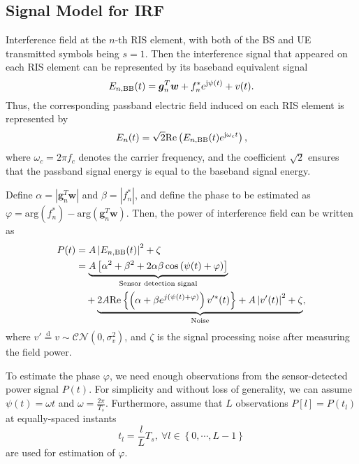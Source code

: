 \documentclass[12pt,draftclsnofoot,journal,onecolumn]{IEEEtran}
\theoremstyle{nonumberplain}
\def \arg {\text{arg}}
\begin{document}
\subsection{Signal Model for IRF}
\label{Models for IRFs}
    Interference field at the $n$-th RIS element, with both of the  \ac{BS} and \ac{UE} transmitted symbols being $s=1$. Then the interference signal that appeared on each RIS element can be represented by its baseband equivalent signal
    \begin{equation}
    \label{interference}
    E_{n,{\rm BB}}(t)=\bm g_{n}^{T}\bm w+f_{n}^{*}e^{{\rm j}\psi (t)}+v(t).
    \end{equation}
    Thus, the corresponding passband electric field induced on each RIS element is represented by 
    \begin{equation}
        E_{n}(t) = \sqrt{2} {\rm Re}\left( E_{n,{\rm BB}}(t)e^{{\rm j}\omega_c t} \right),
    \end{equation}
    where $\omega_c = 2\pi f_c$ denotes the carrier frequency, and the coefficient $\sqrt{2}$ ensures that the passband signal energy is equal to the baseband signal energy. 

    Define $\alpha = \left\vert\bm g_{n}^{T}\bm w\right\vert$ and $\beta = \left\vert f_{n}^{*}\right \vert$, and define the phase to be estimated as $\varphi = \arg\left(f_{n}^{*}\right)-\arg\left(\bm g_{n}^{T}\bm w\right)$. Then, the power of interference field can be written as
    \begin{equation}
        \label{Power of Interference}
        \begin{aligned}
            P(t)&=A \left| E_{n, {\rm BB}} (t)\right |^{2}+\zeta\\
            &=\underbrace{A\left[\alpha^{2}+\beta^{2}+2\alpha\beta\cos\left(\psi(t)+\varphi\right)\right]}_{\text{Sensor detection signal}}\\
            &~~~+\underbrace{2A\text{Re}\left\{\left(\alpha+\beta e^{j\left(\psi(t)+\varphi\right)}\right)v'^{*}(t)\right\}+A\left|v'(t)\right|^{2}+\zeta}_{\text{Noise}},\\
        \end{aligned}
    \end{equation}
    where $v'\overset{\text{d}}{=}v\sim\mathcal{CN}\left(0,\sigma_{v}^{2}\right)$, and $\zeta$ is the signal processing noise after measuring the field power. 

    To estimate the phase $\varphi$, we need enough observations from the sensor-detected power signal $P(t)$. For simplicity and without loss of generality, we can assume $\psi(t)=\omega t$ and $\omega=\frac{2\pi}{T_{s}}$. Furthermore, assume that $L$ observations $P[l]=P(t_{l})$ at equally-spaced instants 
    \begin{equation}
        \label{observation time}
        t_{l}=\frac{l}{L}T_{s},~\forall l\in \left\{0,\cdots ,L-1\right\}
    \end{equation}
    are used for estimation of $\varphi$.
\end{document}
